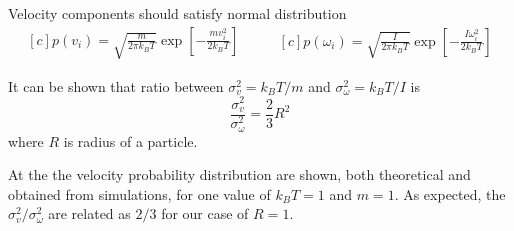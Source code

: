 Velocity components should satisfy normal distribution 
\begin{equation}
\label{eq:maxwell_boltzmann_velocity_components}
	\begin{aligned}[c]
		p(v_i)
			= \sqrt{ \frac{m}{2 \pi k_BT}}
			\exp \left[-\frac{mv_i^2}{2k_BT}\right]
	\end{aligned}
	\qquad
	\begin{aligned}[c]
		p(\omega_i)
			= \sqrt{ \frac{I}{2 \pi k_BT}}
			\exp\left[-\frac{I\omega_i^2}{2k_BT}\right]
	\end{aligned}
\end{equation}

It can be shown that ratio between $\sigma^2_v = k_BT/m$ and $\sigma^2_\omega = k_BT/I$ is
\begin{equation}
\label{eq:velocity_deviation_relation}
	\frac{\sigma^2_v}{\sigma^2_\omega} = \frac{2}{3}R^2
\end{equation}
where $R$ is radius of a particle.

At the  the velocity probability distribution are shown, both theoretical and obtained from simulations, for one value of $k_BT = 1$ and $m = 1$. As expected, the $\sigma^2_v / \sigma^2_\omega$ are related as $2/3$ for our case of $R = 1$.

